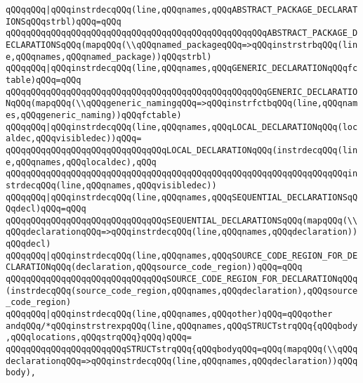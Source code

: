 \newline
\verb|qQQqqQQq|\verb#|qQQqinstrdecqQQq(line,qQQqnames,qQQqABSTRACT_PACKAGE_DECLARATIONSqQQqstrbl)qQQq=qQQq#\newline
\verb|qQQqqQQqqQQqqQQqqQQqqQQqqQQqqQQqqQQqqQQqqQQqqQQqqQQqABSTRACT_PACKAGE_DECLARATIONSqQQq(mapqQQq(\\qQQqnamed_packageqQQq=>qQQqinstrstrbqQQq(line,qQQqnames,qQQqnamed_package))qQQqstrbl)|\newline
\verb|qQQqqQQq|\verb#|qQQqinstrdecqQQq(line,qQQqnames,qQQqGENERIC_DECLARATIONqQQqfctable)qQQq=qQQq#\newline
\verb|qQQqqQQqqQQqqQQqqQQqqQQqqQQqqQQqqQQqqQQqqQQqqQQqqQQqGENERIC_DECLARATIONqQQq(mapqQQq(\\qQQqgeneric_namingqQQq=>qQQqinstrfctbqQQq(line,qQQqnames,qQQqgeneric_naming))qQQqfctable)|\newline
\verb|qQQqqQQq|\verb#|qQQqinstrdecqQQq(line,qQQqnames,qQQqLOCAL_DECLARATIONqQQq(localdec,qQQqvisibledec))qQQq=#\newline
\verb|qQQqqQQqqQQqqQQqqQQqqQQqqQQqqQQqLOCAL_DECLARATIONqQQq(instrdecqQQq(line,qQQqnames,qQQqlocaldec),qQQq|\newline
\verb|qQQqqQQqqQQqqQQqqQQqqQQqqQQqqQQqqQQqqQQqqQQqqQQqqQQqqQQqqQQqqQQqqQQqinstrdecqQQq(line,qQQqnames,qQQqvisibledec))|\newline
\verb|qQQqqQQq|\verb#|qQQqinstrdecqQQq(line,qQQqnames,qQQqSEQUENTIAL_DECLARATIONSqQQqdecl)qQQq=qQQq#\newline
\verb|qQQqqQQqqQQqqQQqqQQqqQQqqQQqqQQqSEQUENTIAL_DECLARATIONSqQQq(mapqQQq(\\qQQqdeclarationqQQq=>qQQqinstrdecqQQq(line,qQQqnames,qQQqdeclaration))qQQqdecl)|\newline
\verb|qQQqqQQq|\verb#|qQQqinstrdecqQQq(line,qQQqnames,qQQqSOURCE_CODE_REGION_FOR_DECLARATIONqQQq(declaration,qQQqsource_code_region))qQQq=qQQq#\newline
\verb|qQQqqQQqqQQqqQQqqQQqqQQqqQQqqQQqSOURCE_CODE_REGION_FOR_DECLARATIONqQQq(instrdecqQQq(source_code_region,qQQqnames,qQQqdeclaration),qQQqsource_code_region)|\newline
\verb|qQQqqQQq|\verb#|qQQqinstrdecqQQq(line,qQQqnames,qQQqother)qQQq=qQQqother#\newline
\newline
\verb|andqQQq/*qQQqinstrstrexpqQQq(line,qQQqnames,qQQqSTRUCTstrqQQq{qQQqbody,qQQqlocations,qQQqstrqQQq}qQQq)qQQq=|\newline
\verb|qQQqqQQqqQQqqQQqqQQqqQQqSTRUCTstrqQQq{qQQqbodyqQQq=qQQq(mapqQQq(\\qQQqdeclarationqQQq=>qQQqinstrdecqQQq(line,qQQqnames,qQQqdeclaration))qQQqbody),|\newline
